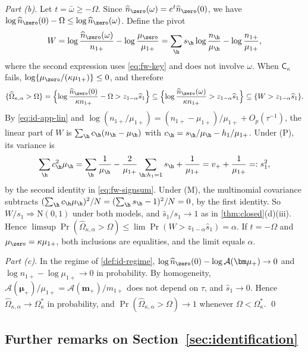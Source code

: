 \emph{Part (b).} Let $t=\bar\omega\ge-\Omega$. Since $\widehat n_{\zero}(\omega)=e^{t}\widehat n_{\zero}(0)$, we have $\log\widehat n_{\zero}(0)-\Omega\le\log\widehat n_{\zero}(\omega)$. Define the pivot
\[
  W=\log\frac{\widehat n_{\zero}(\omega)}{n_{1+}}-\log\frac{\mu_{\zero}}{\mu_{1+}}
   =\sum_{\h}s_{\h}\log\frac{n_{\h}}{\mu_{\h}}-\log\frac{n_{1+}}{\mu_{1+}},
\]
where the second expression uses \eqref{eq:fw-key} and does not involve $\omega$. When $\mathsf C_\kappa$ fails, $\log\{\mu_{\zero}/(\kappa\mu_{1+})\}\le0$, and therefore
\[
  \{\widehat\Omega_{\kappa,\alpha}>\Omega\}
  =\Bigl\{\log\frac{\widehat n_{\zero}(0)}{\kappa n_{1+}}-\Omega>z_{1-\alpha}\widehat s_1\Bigr\}
  \subseteq\Bigl\{\log\frac{\widehat n_{\zero}(\omega)}{\kappa n_{1+}}>z_{1-\alpha}\widehat s_1\Bigr\}
  \subseteq\{W>z_{1-\alpha}\widehat s_1\}.
\]
By \eqref{eq:id-app-lin} and $\log(n_{1+}/\mu_{1+})=(n_{1+}-\mu_{1+})/\mu_{1+}+O_p(\tau^{-1})$, the linear part of $W$ is $\sum_{\h}c_{\h}(n_{\h}-\mu_{\h})$ with $c_{\h}=s_{\h}/\mu_{\h}-h_1/\mu_{1+}$. Under (P), its variance is
\[
  \sum_{\h}c_{\h}^2\mu_{\h}=\sum_{\h}\frac1{\mu_{\h}}-\frac{2}{\mu_{1+}}\sum_{\h:h_1=1}s_{\h}+\frac{1}{\mu_{1+}}=v_++\frac1{\mu_{1+}}=:s_1^2,
\]
by the second identity in \eqref{eq:fw-signsum}. Under (M), the multinomial covariance subtracts $(\sum_{\h}c_{\h}\mu_{\h})^2/N=(\sum_{\h}s_{\h}-1)^2/N=0$, by the first identity. So $W/s_1\Rightarrow\mathrm N(0,1)$ under both models, and $\widehat s_1/s_1\to1$ as in \cref{thm:closed}(d)(iii). Hence $\limsup\Pr(\widehat\Omega_{\kappa,\alpha}>\Omega)\le\lim\Pr(W>z_{1-\alpha}\widehat s_1)=\alpha$. If $t=-\Omega$ and $\mu_{\zero}=\kappa\mu_{1+}$, both inclusions are equalities, and the limit equals $\alpha$.

\emph{Part (c).} In the regime of \cref{def:id-regime}, $\log\widehat n_{\zero}(0)-\log\mathcal A(\bm\mu_+)\to0$ and $\log n_{1+}-\log\mu_{1+}\to0$ in probability. By homogeneity, $\mathcal A(\bm\mu_+)/\mu_{1+}=\mathcal A(\bm m_+)/m_{1+}$ does not depend on $\tau$, and $\widehat s_1\to0$. Hence $\widehat\Omega_{\kappa,\alpha}\to\Omega^*_\kappa$ in probability, and $\Pr(\widehat\Omega_{\kappa,\alpha}>\Omega)\to1$ whenever $\Omega<\Omega^*_\kappa$. \qed

\subsection{Further remarks on Section~\ref{sec:identification}}\label{app:id-remarks}

